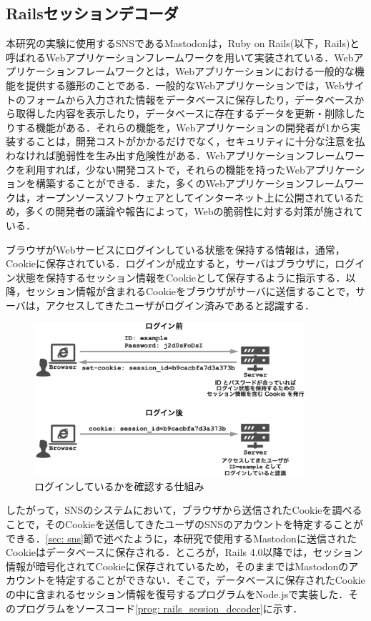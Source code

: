 \documentclass[10pt, a4paper]{jreport}
\begin{document}
\subsection{Railsセッションデコーダ}\label{sec: rails_session_decoder}
本研究の実験に使用するSNSであるMastodonは，Ruby on Rails(以下，Rails)と呼ばれるWebアプリケーションフレームワークを用いて実装されている．Webアプリケーションフレームワークとは，Webアプリケーションにおける一般的な機能を提供する雛形のことである．一般的なWebアプリケーションでは，Webサイトのフォームから入力された情報をデータベースに保存したり，データベースから取得した内容を表示したり，データベースに存在するデータを更新・削除したりする機能がある．それらの機能を，Webアプリケーションの開発者が1から実装することは，開発コストがかかるだけでなく，セキュリティに十分な注意を払わなければ脆弱性を生み出す危険性がある．Webアプリケーションフレームワークを利用すれば，少ない開発コストで，それらの機能を持ったWebアプリケーションを構築することができる．また，多くのWebアプリケーションフレームワークは，オープンソースソフトウェアとしてインターネット上に公開されているため，多くの開発者の議論や報告によって，Webの脆弱性に対する対策が施されている．

ブラウザがWebサービスにログインしている状態を保持する情報は，通常，Cookieに保存されている．ログインが成立すると，サーバはブラウザに，ログイン状態を保持するセッション情報をCookieとして保存するように指示する．以降，セッション情報が含まれるCookieをブラウザがサーバに送信することで，サーバは，アクセスしてきたユーザがログイン済みであると認識する．

\begin{figure}[H]
	\begin{center}
		\includegraphics[width=100mm]{figures/session_cookie.pdf}
	\end{center}
	\caption{ログインしているかを確認する仕組み}
	\label{fig: session_cookie}
\end{figure}

したがって，SNSのシステムにおいて，ブラウザから送信されたCookieを調べることで，そのCookieを送信してきたユーザのSNSのアカウントを特定することができる．\ref{sec: sns}節で述べたように，本研究で使用するMastodonに送信されたCookieはデータベースに保存される．ところが，Rails 4.0以降では，セッション情報が暗号化されてCookieに保存されている\cite{rails_session_is_encrypted}ため，そのままではMastodonのアカウントを特定することができない．そこで，データベースに保存されたCookieの中に含まれるセッション情報を復号するプログラムをNode.jsで実装した．そのプログラムをソースコード\ref{prog: rails_session_decoder}に示す．
\end{document}
